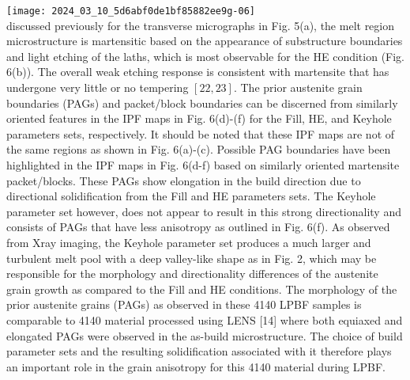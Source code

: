 \documentclass[10pt]{article}
\begin{document}
\texttt{[image: 2024\_03\_10\_5d6abf0de1bf85882ee9g-06]}\\
discussed previously for the transverse micrographs in Fig. 5(a), the melt region microstructure is martensitic based on the appearance of substructure boundaries and light etching of the laths, which is most observable for the HE condition (Fig. 6(b)). The overall weak etching response is consistent with martensite that has undergone very little or no tempering $[22,23]$. The prior austenite grain boundaries (PAGs) and packet/block boundaries can be discerned from similarly oriented features in the IPF maps in Fig. 6(d)-(f) for the Fill, HE, and Keyhole parameters sets, respectively. It should be noted that these IPF maps are not of the same regions as shown in Fig. 6(a)-(c). Possible PAG boundaries have been highlighted in the IPF maps in Fig. 6(d-f) based on similarly oriented martensite packet/blocks. These PAGs show elongation in the build direction due to directional solidification from the Fill and HE parameters sets. The Keyhole parameter set however, does not appear to result in this strong directionality and consists of PAGs that have less anisotropy as outlined in Fig. 6(f). As observed from Xray imaging, the Keyhole parameter set produces a much larger and turbulent melt pool with a deep valley-like shape as in Fig. 2, which may be responsible for the morphology and directionality differences of the austenite grain growth as compared to the Fill and HE conditions. The morphology of the prior austenite grains (PAGs) as observed in these 4140 LPBF samples is comparable to 4140 material processed using LENS [14] where both equiaxed and elongated PAGs were observed in the as-build microstructure. The choice of build parameter sets and the resulting solidification associated with it therefore plays an important role in the grain anisotropy for this 4140 material during LPBF.
\end{document}
